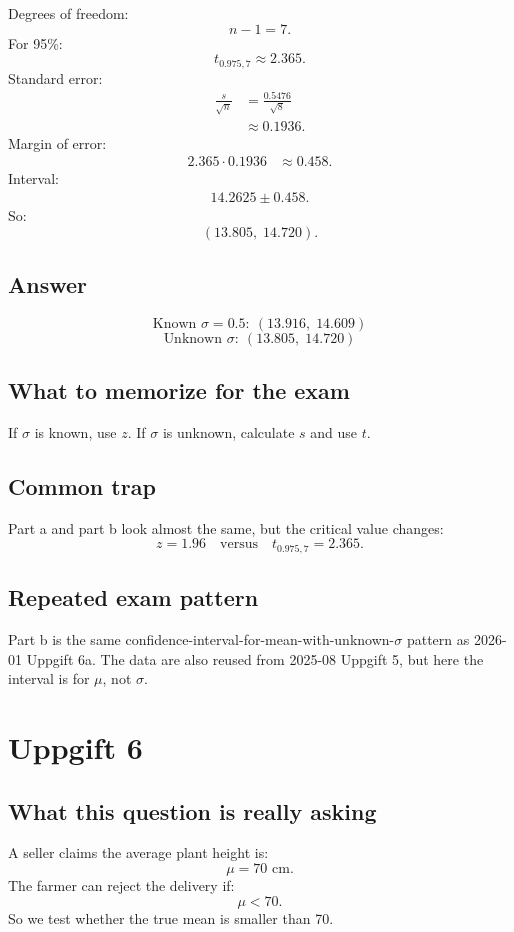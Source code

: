 \documentclass[11pt,a4paper]{article}
\begin{document}
Degrees of freedom:
\[
n-1=7.
\]
For 95\%:
\[
t_{0.975,7}\approx 2.365.
\]
Standard error:
\begin{align*}
\frac{s}{\sqrt{n}}
&=\frac{0.5476}{\sqrt{8}}\\
&\approx 0.1936.
\end{align*}
Margin of error:
\begin{align*}
2.365\cdot 0.1936&\approx 0.458.
\end{align*}
Interval:
\begin{align*}
14.2625\pm 0.458.
\end{align*}
So:
\[
(13.805,\;14.720).
\]

\subsection*{Answer}
\[
\boxed{\text{Known }\sigma=0.5:\ (13.916,\;14.609)}
\]
\[
\boxed{\text{Unknown }\sigma:\ (13.805,\;14.720)}
\]

\subsection*{What to memorize for the exam}
If \(\sigma\) is known, use \(z\). If \(\sigma\) is unknown, calculate \(s\) and use \(t\).

\subsection*{Common trap}
Part a and part b look almost the same, but the critical value changes:
\[
z=1.96 \quad \text{versus} \quad t_{0.975,7}=2.365.
\]

\subsection*{Repeated exam pattern}
Part b is the same confidence-interval-for-mean-with-unknown-\(\sigma\) pattern as 2026-01 Uppgift 6a. The data are also reused from 2025-08 Uppgift 5, but here the interval is for \(\mu\), not \(\sigma\).

\section*{Uppgift 6}

\subsection*{What this question is really asking}
A seller claims the average plant height is:
\[
\mu=70\text{ cm}.
\]
The farmer can reject the delivery if:
\[
\mu<70.
\]
So we test whether the true mean is smaller than 70.
\end{document}
